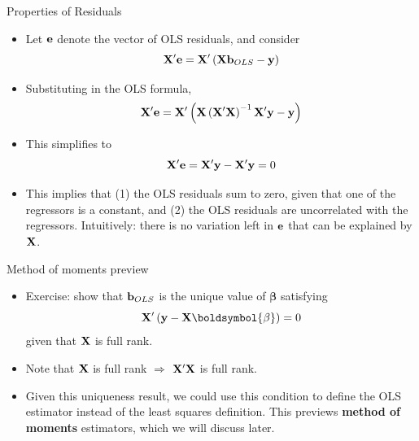 \documentclass[aspectratio=169,11pt]{beamer}
\begin{document}
\begin{frame}{Properties of Residuals}
\begin{itemize}
	\item Let ${\bf e} $ denote the vector of OLS residuals, and consider \[
		{\bf X}' {\bf e} = {\bf X}' \left({\bf X} {\bf b}_{OLS} - {\bf y} \right) 
	\]
	\item Substituting in the OLS formula, 
 \[
		{\bf X}' {\bf e} = {\bf X}' \left({\bf X} \left({\bf X}'{\bf X}\right)^{-1} {\bf X}' {\bf y} - {\bf y} \right) 
	\]

\item This simplifies to 
 \[
		{\bf X}' {\bf e} = {\bf X}' {\bf y} -  {\bf X}' {\bf y}  = 0
	\]

	\item This implies that (1) the OLS residuals sum to zero, given that one of the regressors is a constant, and
	(2) the OLS residuals are uncorrelated with the regressors. Intuitively: there is no variation left in ${\bf e} $
	 that can be explained by ${\bf X}$.
	
\end{itemize}
\end{frame}


\begin{frame}{Method of moments preview}
\begin{itemize}
	\item Exercise: show that ${\bf b}_{OLS}$ is the unique value of $\boldsymbol{\beta}$ satisfying 
	\[
		{\bf X}' \left({\bf y} - {\bf X} \boldsymbol{\beta}  \right) =0
	\]
	given that ${\bf X}$ is full rank.

	\medskip
	\item Note that ${\bf X}$ is full rank $\Rightarrow$ ${\bf X}'{\bf X}$ is full rank.

	\medskip 
	\item Given this uniqueness result, we could use this condition to define the OLS estimator 
	instead of the least squares definition. 
	This previews {\bf method of moments} estimators, which we will discuss later.
	
\end{itemize}
\end{frame}

\end{document}
